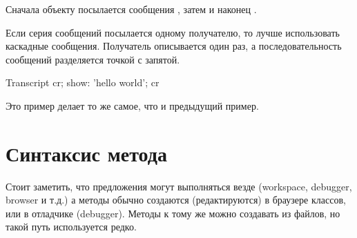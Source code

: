 \documentclass[a4paper,10pt,twoside]{book}
\begin{document}
\noindent
Сначала объекту  посылается сообщения , затем  и наконец .


Если серия сообщений посылается одному получателю, то лучше использовать каскадные сообщения.
Получатель описывается один раз, а последовательность сообщений разделяется точкой с запятой.

\begin{code}{}
Transcript cr;
    show: 'hello world';
    cr
\end{code}


Это пример делает то же самое, что и предыдущий пример.


\section{Синтаксис метода}


Стоит заметить, что предложения могут выполняться везде (workspace, debugger, browser и т.д.)
а методы обычно создаются (редактируются) в браузере классов, или в отладчике (debugger).
Методы к тому же можно создавать из файлов, но такой путь используется редко.
\end{document}
